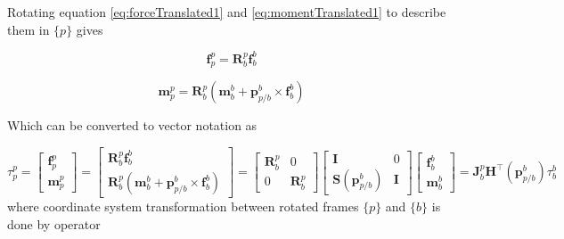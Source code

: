 Rotating equation \ref{eq:forceTranslated1} and \ref{eq:momentTranslated1} to describe them in $\{p\}$ gives

\begin{equation}
\textbf{f}_{p}^p = \textbf{R}_{b}^{p}\textbf{f}_{b}^b
\label{eq:forceTranslated2}
\end{equation}

\begin{equation}
\textbf{m}_{p}^p = \textbf{R}_{b}^{p}(\textbf{m}_{b}^b + \textbf{p}_{p/b}^{b} \times \textbf{f}_{b}^b)
\label{eq:momentTranslated2}
\end{equation}

Which can be converted to vector notation as

\begin{equation}
\tau_{p}^{p} = \begin{bmatrix} \textbf{f}_{p}^{p} \\[10pt] 
\textbf{m}_{p}^{p}
\end{bmatrix} = \begin{bmatrix} \textbf{R}_{b}^{p}\textbf{f}_{b}^b \\[10pt] 
\textbf{R}_{b}^{p}(\textbf{m}_{b}^b + \textbf{p}_{p/b}^{b} \times \textbf{f}_{b}^b)
\end{bmatrix} = \begin{bmatrix} \textbf{R}_{b}^{p} & 0 \\[10pt] 
0 & \textbf{R}_{b}^{p}\end{bmatrix} \begin{bmatrix} \textbf{I} & 0 \\[10pt] 
\textbf{S}(\textbf{p}_{p/b}^{b}) & \textbf{I}\end{bmatrix} \begin{bmatrix} \textbf{f}_{b}^b \\[10pt] 
\textbf{m}_{b}^{b}
\end{bmatrix} = \textbf{J}_{b}^{p} \textbf{H}^\top (\textbf{p}_{p/b}^{b})  \tau_{b}^{b}
\label{eq:forceMomentRotateAndTranslate1}
\end{equation}
where coordinate system transformation between rotated frames $\{p\}$ and $\{b\}$ is done by operator 

